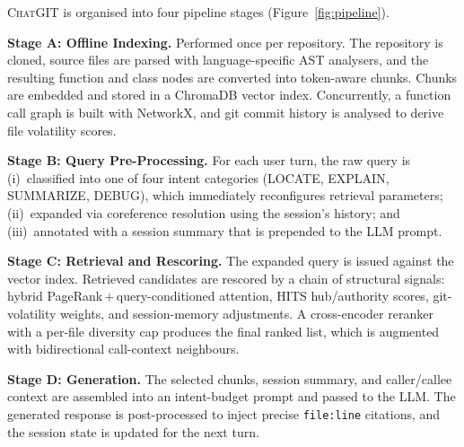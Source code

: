 \documentclass[runningheads]{llncs}
\newcommand{\chatgit}{\textsc{ChatGIT}\xspace}
\begin{document}
\chatgit is organised into four pipeline stages
(Figure~\ref{fig:pipeline}).

\textbf{Stage A: Offline Indexing.}
Performed once per repository. The repository is cloned, source
files are parsed with language-specific AST analysers, and the
resulting function and class nodes are converted into token-aware
chunks. Chunks are embedded and stored in a ChromaDB vector index.
Concurrently, a function call graph is built with NetworkX,
and git commit history is analysed to derive file volatility scores.

\textbf{Stage B: Query Pre-Processing.}
For each user turn, the raw query is (i)~classified into one of
four intent categories (LOCATE, EXPLAIN, SUMMARIZE, DEBUG), which
immediately reconfigures retrieval parameters; (ii)~expanded via
coreference resolution using the session's history; and
(iii)~annotated with a session summary that is prepended to the
LLM prompt.

\textbf{Stage C: Retrieval and Rescoring.}
The expanded query is issued against the vector index. Retrieved
candidates are rescored by a chain of structural signals:
hybrid PageRank\,+\,query-conditioned attention, HITS
hub/authority scores, git-volatility weights, and
session-memory adjustments. A cross-encoder reranker with a
per-file diversity cap produces the final ranked list, which is
augmented with bidirectional call-context neighbours.

\textbf{Stage D: Generation.}
The selected chunks, session summary, and caller/callee context
are assembled into an intent-budget prompt and passed to the LLM.
The generated response is post-processed to inject precise
\texttt{file:line} citations, and the session state is updated for
the next turn.
\end{document}
